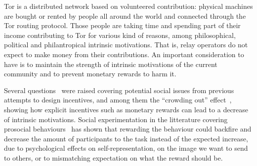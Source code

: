 

Tor is a distributed network based on volunteered contribution: 
physical machines are bought or rented by people all around the 
world and connected through the Tor routing protocol. Those 
people are taking time and spending part of their income 
contributing to Tor for various kind of reasons, among 
philosophical, political and philantropical intrinsic 
motivations. That is, relay operators do not expect to make money 
from their contributions. An important consideration to have is 
to maintain the strength of intrinsic motivations of the current 
community and to prevent monetary rewards to harm it.

Several questions~\cite{jansenblogpost} were raised covering 
potential social issues from previous attempts to design incentives, 
and among them the ``crowding out'' effect~\cite{10.1257/jep.25.4.191}, showing how 
explicit incentives such as monetary rewards can lead to a decrease 
of intrinsic motivations. Social experimentation in the litterature 
covering prosocial behaviours~\cite{10.1257/aer.96.5.1652} has shown that rewarding the 
behaviour could backfire and decrease the amount of participants to the 
task instead of the expected increase, due to psychological effects on 
self-representation, on the image we want to send to others, or to 
mismatching expectation on what the reward should be. 

